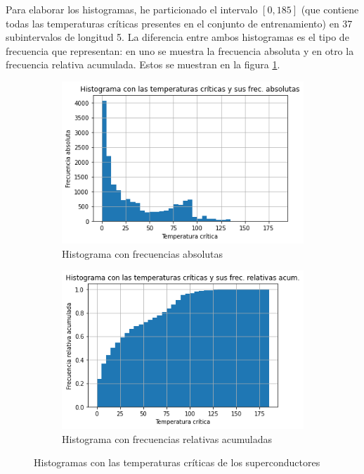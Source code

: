 \documentclass[10pt,a4paper]{article}
\begin{document}
Para elaborar los histogramas, he particionado el intervalo $[0,185]$ (que contiene todas las temperaturas críticas presentes en el conjunto de entrenamiento) en 37 subintervalos de longitud 5. La diferencia entre ambos histogramas es el tipo de frecuencia que representan: en uno se muestra la frecuencia absoluta y en otro la frecuencia relativa acumulada. Estos se muestran en la figura \ref{fig:reg_histogramas}.

\begin{figure}[h]
	\begin{subfigure}{0.5\textwidth}
		\centering
		\includegraphics[width=\textwidth]{reg_hist_abs}
		\caption{Histograma con frecuencias absolutas}
	\end{subfigure}
	\begin{subfigure}{0.5\textwidth}
		\centering
		\includegraphics[width=\textwidth]{reg_hist_rel}
		\caption{Histograma con frecuencias relativas acumuladas}
	\end{subfigure}
	\caption{Histogramas con las temperaturas críticas de los superconductores}
	\label{fig:reg_histogramas}
\end{figure}
\end{document}
